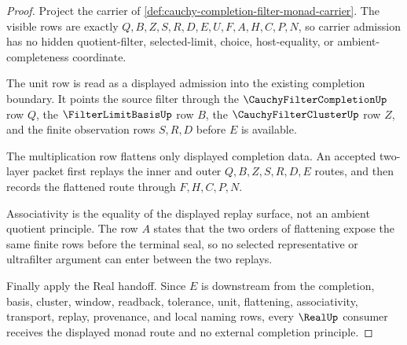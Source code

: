 \begin{proof}
Project the carrier of \autoref{def:cauchy-completion-filter-monad-carrier}. The visible rows are exactly $Q,B,Z,S,R,D,E,U,F,A,H,C,P,N$, so carrier admission has no hidden quotient-filter, selected-limit, choice, host-equality, or ambient-completeness coordinate.

The unit row is read as a displayed admission into the existing completion boundary. It points the source filter through the $\CauchyFilterCompletionUp$ row $Q$, the $\FilterLimitBasisUp$ row $B$, the $\CauchyFilterClusterUp$ row $Z$, and the finite observation rows $S,R,D$ before $E$ is available.

The multiplication row flattens only displayed completion data. An accepted two-layer packet first replays the inner and outer $Q,B,Z,S,R,D,E$ routes, and then records the flattened route through $F,H,C,P,N$.

Associativity is the equality of the displayed replay surface, not an ambient quotient principle. The row $A$ states that the two orders of flattening expose the same finite rows before the terminal seal, so no selected representative or ultrafilter argument can enter between the two replays.

Finally apply the Real handoff. Since $E$ is downstream from the completion, basis, cluster, window, readback, tolerance, unit, flattening, associativity, transport, replay, provenance, and local naming rows, every $\RealUp$ consumer receives the displayed monad route and no external completion principle.
\end{proof}





